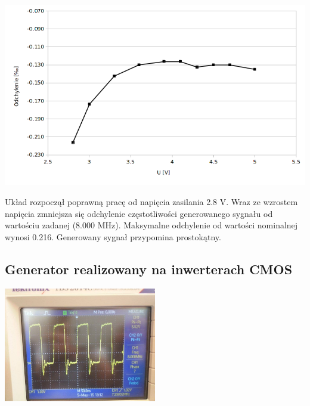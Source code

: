 \documentclass[a4paper,12pt]{article}
\begin{document}
\begin{center}
  \includegraphics[width=1\textwidth]{z1}
\end{center}
Układ rozpoczął poprawną pracę od napięcia zasilania 2.8 V. Wraz ze wzrostem napięcia zmniejsza się odchylenie częstotliwości generowanego sygnału od wartościu zadanej (8.000 MHz). Maksymalne odchylenie od wartości nominalnej wynosi 0.216\permil. Generowany sygnał przypomina prostokątny.

\pagebreak
\subsection{Generator realizowany na inwerterach CMOS }
\begin{center}
  \center
  \includegraphics[width=0.5\textwidth]{o2}
\end{center}
\end{document}
